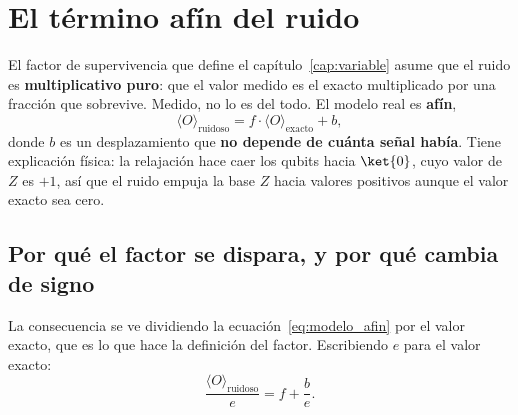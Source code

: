 \chapter{El término afín del ruido}
\label{anexo:factor_negativo}

%
%
%

El factor de supervivencia que define el capítulo~\ref{cap:variable} asume que el ruido es
\textbf{multiplicativo puro}: que el valor medido es el exacto multiplicado por una fracción
que sobrevive. Medido, no lo es del todo. El modelo real es \textbf{afín},
\begin{equation}
\label{eq:modelo_afin}
\langle O \rangle_{\text{ruidoso}} = f \cdot \langle O \rangle_{\text{exacto}} + b ,
\end{equation}
\noindent donde $b$ es un desplazamiento que \textbf{no depende de cuánta señal había}. Tiene
explicación física: la relajación hace caer los qubits hacia $\ket{0}$, cuyo valor de $Z$ es
$+1$, así que el ruido empuja la base $Z$ hacia valores positivos aunque el valor exacto sea
cero.

\section{Por qué el factor se dispara, y por qué cambia de signo}

La consecuencia se ve dividiendo la ecuación~\eqref{eq:modelo_afin} por el valor exacto, que
es lo que hace la definición del factor. Escribiendo $e$ para el valor exacto:
\begin{equation}
\label{eq:factor_afin}
\frac{\langle O \rangle_{\text{ruidoso}}}{e} = f + \frac{b}{e} .
\end{equation}

